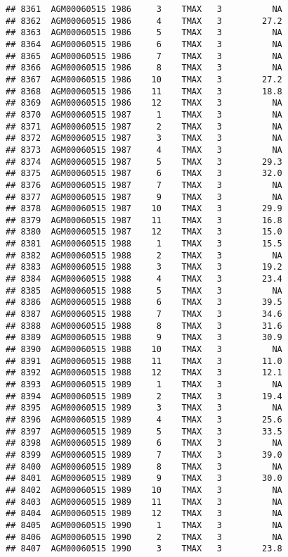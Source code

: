 \documentclass{article}\usepackage[]{graphicx}\usepackage[]{color}
\makeatletter
\newenvironment{kframe}{%
 \def\at@end@of@kframe{}%
 \ifinner\ifhmode%
  \def\at@end@of@kframe{\end{minipage}}%
  \begin{minipage}{\columnwidth}%
 \fi\fi%
 \def\FrameCommand##1{\hskip\@totalleftmargin \hskip-\fboxsep
 \colorbox{shadecolor}{##1}\hskip-\fboxsep
     \hskip-\linewidth \hskip-\@totalleftmargin \hskip\columnwidth}%
 \MakeFramed {\advance\hsize-\width
   \@totalleftmargin\z@ \linewidth\hsize
   \@setminipage}}%
 {\par\unskip\endMakeFramed%
 \at@end@of@kframe}
\newenvironment{knitrout}{}{} %
\makeatother
\begin{document}
\begin{knitrout}
\begin{kframe}
\begin{verbatim}
## 8361  AGM00060515 1986     3    TMAX   3          NA
## 8362  AGM00060515 1986     4    TMAX   3        27.2
## 8363  AGM00060515 1986     5    TMAX   3          NA
## 8364  AGM00060515 1986     6    TMAX   3          NA
## 8365  AGM00060515 1986     7    TMAX   3          NA
## 8366  AGM00060515 1986     8    TMAX   3          NA
## 8367  AGM00060515 1986    10    TMAX   3        27.2
## 8368  AGM00060515 1986    11    TMAX   3        18.8
## 8369  AGM00060515 1986    12    TMAX   3          NA
## 8370  AGM00060515 1987     1    TMAX   3          NA
## 8371  AGM00060515 1987     2    TMAX   3          NA
## 8372  AGM00060515 1987     3    TMAX   3          NA
## 8373  AGM00060515 1987     4    TMAX   3          NA
## 8374  AGM00060515 1987     5    TMAX   3        29.3
## 8375  AGM00060515 1987     6    TMAX   3        32.0
## 8376  AGM00060515 1987     7    TMAX   3          NA
## 8377  AGM00060515 1987     9    TMAX   3          NA
## 8378  AGM00060515 1987    10    TMAX   3        29.9
## 8379  AGM00060515 1987    11    TMAX   3        16.8
## 8380  AGM00060515 1987    12    TMAX   3        15.0
## 8381  AGM00060515 1988     1    TMAX   3        15.5
## 8382  AGM00060515 1988     2    TMAX   3          NA
## 8383  AGM00060515 1988     3    TMAX   3        19.2
## 8384  AGM00060515 1988     4    TMAX   3        23.4
## 8385  AGM00060515 1988     5    TMAX   3          NA
## 8386  AGM00060515 1988     6    TMAX   3        39.5
## 8387  AGM00060515 1988     7    TMAX   3        34.6
## 8388  AGM00060515 1988     8    TMAX   3        31.6
## 8389  AGM00060515 1988     9    TMAX   3        30.9
## 8390  AGM00060515 1988    10    TMAX   3          NA
## 8391  AGM00060515 1988    11    TMAX   3        11.0
## 8392  AGM00060515 1988    12    TMAX   3        12.1
## 8393  AGM00060515 1989     1    TMAX   3          NA
## 8394  AGM00060515 1989     2    TMAX   3        19.4
## 8395  AGM00060515 1989     3    TMAX   3          NA
## 8396  AGM00060515 1989     4    TMAX   3        25.6
## 8397  AGM00060515 1989     5    TMAX   3        33.5
## 8398  AGM00060515 1989     6    TMAX   3          NA
## 8399  AGM00060515 1989     7    TMAX   3        39.0
## 8400  AGM00060515 1989     8    TMAX   3          NA
## 8401  AGM00060515 1989     9    TMAX   3        30.0
## 8402  AGM00060515 1989    10    TMAX   3          NA
## 8403  AGM00060515 1989    11    TMAX   3          NA
## 8404  AGM00060515 1989    12    TMAX   3          NA
## 8405  AGM00060515 1990     1    TMAX   3          NA
## 8406  AGM00060515 1990     2    TMAX   3          NA
## 8407  AGM00060515 1990     3    TMAX   3        23.8

\end{verbatim}
\end{kframe}
\end{knitrout}
\end{document}
